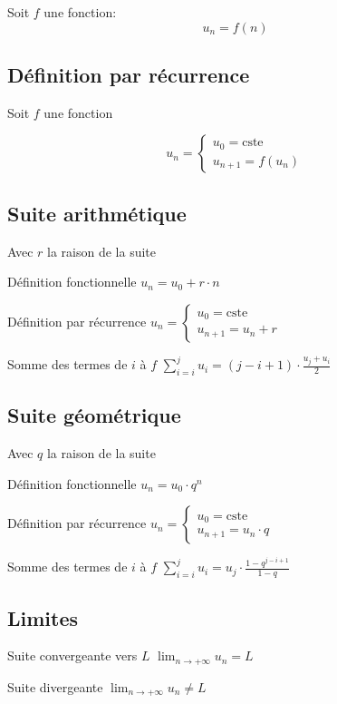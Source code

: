 \documentclass{article}
\newcommand{\oo}{\infty}
\newcommand{ \const}{\text{cste}}
\newenvironment{descriptiona}{\begin{description}[leftmargin=!,labelwidth=\widthof{\bfseries The longest label}]}{\end{description}}
\begin{document}
Soit $f$ une fonction:
\[u_n = f(n)\]

\subsection{Définition par récurrence}
Soit $f$ une fonction

$$u_n = \begin{cases}
u_0 = \const\\
u_{n+1} = f(u_n)
\end{cases}$$

\subsection{Suite arithmétique}

Avec $r$ la raison de la suite

\begin{descriptiona}
\item[Définition fonctionnelle] $u_n = u_0 + r\cdot n$
\item[Définition par récurrence] $u_n = \begin{cases}
u_0 = \const\\
u_{n+1} = u_n + r
\end{cases}$
\item[Somme des termes de $i$ à $f$]$\displaystyle \sum_{i=i}^{j} u_i = (j-i+1)\cdot\frac{u_j + u_i}{2}$
\end{descriptiona}

\subsection{Suite géométrique}

Avec $q$ la raison de la suite

\begin{descriptiona}
\item[Définition fonctionnelle] $u_n = u_0 \cdot q^n$
\item[Définition par récurrence] $u_n = \begin{cases}
u_0 = \const \\
u_{n+1} = u_n \cdot q
\end{cases}$
\item[Somme des termes de $i$ à $f$] $\displaystyle \sum_{i=i}^{j} u_i = u_j\cdot\frac{1 - q^{j-i+1}}{1 - q}$
\end{descriptiona}

\subsection{Limites}
\begin{descriptiona}
\item[Suite convergeante vers $L$] $\displaystyle \lim_{n\to+\oo} u_n = L$
\item[Suite divergeante] $\displaystyle \lim_{n\to+\oo} u_n \not= L$
\end{descriptiona}
\end{document}
